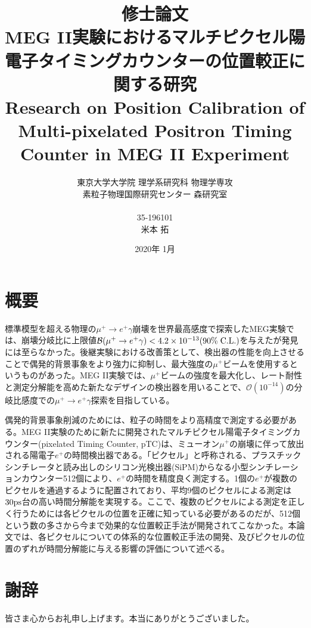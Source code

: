 \documentclass[report]{jsbook}
\title{
修士論文\\[1.8cm]
{\bf MEG II実験におけるマルチピクセル陽電子タイミングカウンターの位置較正に関する研究} \\
{\LARGE Research on Position Calibration of Multi-pixelated Positron Timing Counter in MEG II Experiment}
\\[0.8cm]}
\author{東京大学大学院 理学系研究科 物理学専攻\\
素粒子物理国際研究センター 森研究室\\ \\
35-196101\\[2.5mm]
\LARGE 米本 拓}
\date{2020年 1月}
\begin{document}

\maketitle
\chapter*{概要}

標準模型を超える物理の$\mu^+ \to e^+\gamma$崩壊を世界最高感度で探索したMEG実験では、崩壊分岐比に上限値$\mathcal{B} (\mu^+ \to e^+\gamma) < 4.2 \times 10^{-13} (90\% \; {\rm C.L.})$を与えたが発見には至らなかった。後継実験における改善策として、検出器の性能を向上させることで偶発的背景事象をより強力に抑制し、最大強度の$\mu^+$ビームを使用するというものがあった。MEG II実験では、$\mu^+$ビームの強度を最大化し、レート耐性と測定分解能を高めた新たなデザインの検出器を用いることで、$\mathcal{O}(10^{-14})$の分岐比感度での$\mu^+ \to e^+\gamma$探索を目指している。 

偶発的背景事象削減のためには、粒子の時間をより高精度で測定する必要がある。MEG II実験のために新たに開発されたマルチピクセル陽電子タイミングカウンター(pixelated Timing Counter, pTC)は、ミューオン$\mu^+$の崩壊に伴って放出される陽電子$e^+$の時間検出器である。「ピクセル」と呼称される、プラスチックシンチレータと読み出しのシリコン光検出器(SiPM)からなる小型シンチレーションカウンター512個により、$e^+$の時間を精度良く測定する。1個の$e^+$が複数のピクセルを通過するように配置されており、平均9個のピクセルによる測定は$ 30 \rm ps$台の高い時間分解能を実現する。ここで、複数のピクセルによる測定を正しく行うためには各ピクセルの位置を正確に知っている必要があるのだが、512個という数の多さから今まで効果的な位置較正手法が開発されてこなかった。本論文では、各ピクセルについての体系的な位置較正手法の開発、及びピクセルの位置のずれが時間分解能に与える影響の評価について述べる。 \\

\setcounter{tocdepth}{2}
\tableofcontents








\chapter*{謝辞}
皆さま心からお礼申し上げます。本当にありがとうございました。
\end{document}
